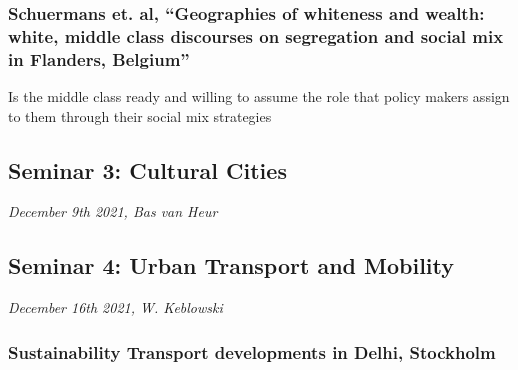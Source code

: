 \documentclass{article}
\begin{document}
\subsubsection{Schuermans et. al, ``Geographies of whiteness and wealth: white, middle class discourses on segregation and social mix in Flanders, Belgium''}
\begin{outline}
	\1 Is the middle class ready and willing to assume the role that policy makers assign to them through their social mix strategies
\end{outline}


\subsection{Seminar 3: Cultural Cities}
\textit{December 9th 2021, Bas van Heur}


\subsection{Seminar 4: Urban Transport and Mobility}
\textit{December 16th 2021, W. Keblowski}

\subsubsection{Sustainability Transport developments in Delhi, Stockholm}
\end{document}

